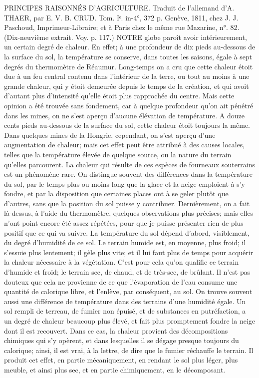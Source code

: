 \setcounter{page}{183} PRINCIPES RAISONNÉS D'AGRICULTURE.
Traduit de l'allemand d'A. THAER, par
E. V. B. CRUD. Tom. Iᵉ. in-4°, 372 p.
Genève, 1811, chez J. J. Paschoud, Imprimeur-Libraire; et à Paris chez le même
rue Mazarine, n°. 82.
(Dix-neuvième extrait. Voy. p. 117.)
NOTRE globe paroît avoir intérieurement, un certain degré de chaleur. En effet; à une profondeur de dix pieds au-dessous de la surface du sol, la température se conserve, dans toutes les saisons, égale à sept degrés du thermomètre de Réaumur. Long-temps on a cru que cette chaleur étoit due à un feu central contenu dans l'intérieur de la terre, ou tout au moins à une grande chaleur, qui y étoit demeurée depuis le temps de la création, et qui avoit d'autant plus d'intensité qu'elle étoit plus rapprochée du centre. Mais cette opinion a été trouvée sans fondement, car à quelque profondeur qu'on ait pénétré dans les mines, on ne s'est aperçu d'aucune élévation de température. A douze cents pieds au-dessous de la\setcounter{page}{184} surface du sol, cette chaleur étoit toujours la même. Dans quelques mines de la Hongrie, cependant, on s'est aperçu d'une augmentation de chaleur; mais cet effet peut être attribué à des causes locales, telles que la température élevée de quelque source, ou la nature du terrain qu'elles parcourent. La chaleur qui résulte de ces espèces de fourneaux souterrains est un phénomène rare.
On distingue souvent des différences dans la température du sol, par le temps plus ou moins long que la glace et la neige emploient à s'y fondre, et par la disposition que certaines places ont à se geler plutôt que d'autres, sans que la position du sol puisse y contribuer.
Dernièrement, on a fait là-dessus, à l'aide du thermomètre, quelques observations plus précises; mais elles n'ont point encore été assez répétées, pour que je puisse présenter rien de plus positif que ce qui va suivre.
La température du sol dépend d'abord, visiblement, du degré d'humidité de ce sol. Le terrain humide est, en moyenne, plus froid; il s'essuie plus lentement; il gèle plus vite; et il lui faut plus de temps pour acquérir la chaleur nécessaire à la végétation.\setcounter{page}{185} C'est pour cela qu'on qualifie ce terrain d'humide et froid; le terrain sec, de chaud, et de très-sec, de brûlant. Il n'est pas douteux que cela ne provienne de ce que l'évaporation de l'eau consume une quantité de calorique libre, et l'enlève, par conséquent, au sol.
On trouve souvent aussi une différence de température dans des terrains d'une humidité égale. Un sol rempli de terreau, de fumier non épuisé, et de substances en putréfaction, a un degré de chaleur beaucoup plus élevé, et fait plus promptement fondre la neige dont il est recouvert. Dans ce cas, la chaleur provient des décompositions chimiques qui s'y opèrent, et dans lesquelles il se dégage presque toujours du calorique; ainsi, il est vrai, à la lettre, de dire que le fumier réchauffe le terrain. Il produit cet effet, en partie mécaniquement, en rendant le sol plus léger, plus meuble, et ainsi plus sec, et en partie chimiquement, en le décomposant.
